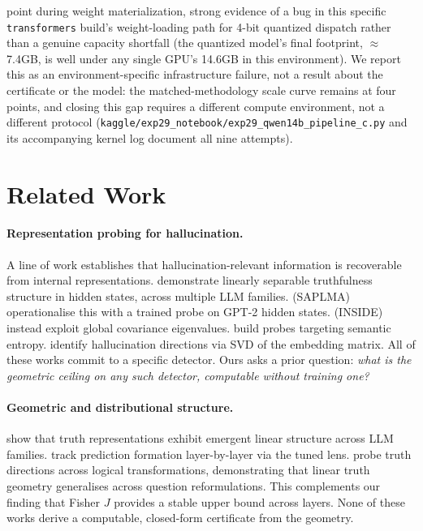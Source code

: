\documentclass[10pt,twocolumn]{article}
\newcommand{\FloatBarrier}{\clearpage}
\begin{document}
\begin{enumerate}[leftmargin=*, topsep=2pt, itemsep=2pt]
  point during weight materialization, strong evidence of a bug in this
  specific \texttt{transformers} build's weight-loading path for 4-bit
  quantized dispatch rather than a genuine capacity shortfall (the
  quantized model's final footprint, $\approx$7.4GB, is well under any
  single GPU's 14.6GB in this environment). We report this as an
  environment-specific infrastructure failure, not a result about the
  certificate or the model: the matched-methodology scale curve remains
  at four points, and closing this gap requires a different compute
  environment, not a different protocol
  (\texttt{kaggle/exp29\_notebook/exp29\_qwen14b\_pipeline\_c.py} and
  its accompanying kernel log document all nine attempts).

\end{enumerate}

\FloatBarrier
\section{Related Work}
\label{sec:related}

\paragraph{Representation probing for hallucination.}
A line of work establishes that hallucination-relevant information is
recoverable from internal representations. \citet{burns2022discovering}
demonstrate linearly separable truthfulness structure in hidden states,
across multiple LLM families. \citet{azaria2023internal} (SAPLMA)
operationalise this with a trained probe on GPT-2 hidden states.
\citet{chen2024inside} (INSIDE) instead exploit global covariance
eigenvalues. \citet{kossen2024semantic} build probes targeting semantic
entropy. \citet{du2024haloscope} identify hallucination directions via
SVD of the embedding matrix. All of these works commit to a specific
detector. Ours asks a prior question: \emph{what is the geometric
ceiling on any such detector, computable without training one?}

\paragraph{Geometric and distributional structure.}
\citet{marks2024geometry} show that truth representations exhibit
emergent linear structure across LLM families. \citet{belrose2023eliciting}
track prediction formation layer-by-layer via the tuned lens.
\citet{bao2025probing} probe truth directions across logical
transformations, demonstrating that linear truth geometry generalises
across question reformulations. This complements our finding that
Fisher $J$ provides a stable upper bound across layers. None of these
works derive a computable, closed-form certificate from the geometry.
\end{document}
